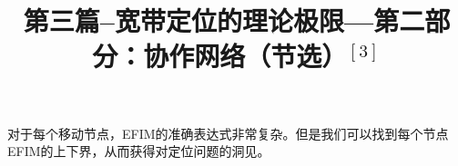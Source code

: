  
% 
\title{第三篇--宽带定位的理论极限---第二部分：协作网络（节选）$^{[3]}$}


对于每个移动节点，EFIM的准确表达式非常复杂。但是我们可以找到每个节点EFIM的上下界，从而获得对定位问题的洞见。

